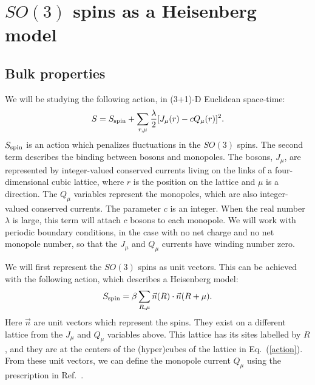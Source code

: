 \documentclass[prb,twocolumn]{revtex4}
\begin{document}
\title{}
\date{\today}
\pacs{}

\author{Scott D. Geraedts}
\author{Olexei I. Motrunich}

\begin{abstract}
\end{abstract}
\maketitle

\section{$SO(3)$ spins as a Heisenberg model}
\label{section::Heisenberg}

\subsection{Bulk properties}
We will be studying the following action, in (3+1)-D Euclidean space-time:
\begin{equation}
S=S_{\rm spin}+\sum_{r,\mu} \frac{\lambda}{2}[ J_\mu(r)-c Q_\mu(r)]^2.
\label{action}
\end{equation}
$S_{\rm spin}$ is an action which penalizes fluctuations in the $SO(3)$ spins. The second term describes the binding between bosons and monopoles. The bosons, $J_\mu$, are represented by integer-valued conserved currents living on the links of a four-dimensional cubic lattice, where $r$ is the position on the lattice and $\mu$ is a direction. The $Q_\mu$ variables represent the monopoles, which are also integer-valued conserved currents. The parameter $c$ is an integer. When the real number $\lambda$ is large, this term will attach $c$ bosons to each monopole. We will work with periodic boundary conditions, in the case with no net charge and no net monopole number, so that the $J_\mu$ and $Q_\mu$ currents have winding number zero.


We will first represent the $SO(3)$ spins as unit vectors. This can be achieved with the following action, which describes a Heisenberg model:
\begin{equation}
S_{\rm spin}=\beta\sum_{R,\mu} \vec{n}(R)\cdot \vec{n}(R+\mu).
\end{equation}
Here $\vec{n}$ are unit vectors which represent the spins. They exist on a different lattice from the $J_\mu$ and $Q_\mu$ variables above. This lattice has its sites labelled by $R$, and they are at the centers of the (hyper)cubes of the lattice in Eq.~(\ref{action}). From these unit vectors, we can define the monopole current $Q_\mu$ using the prescription in Ref.~.
 
\end{document}
